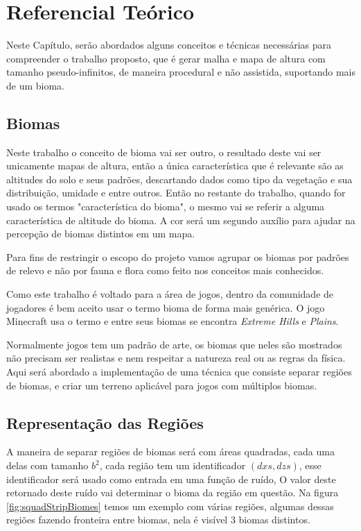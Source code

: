 \chapter{Referencial Teórico}
Neste Capítulo, serão abordados alguns conceitos e técnicas necessárias para
compreender o trabalho proposto, que é 
gerar malha e mapa de altura com tamanho pseudo-infinitos, de maneira procedural
e não assistida, suportando mais de um bioma.

\section{Biomas}
Neste trabalho o conceito de bioma vai ser outro, o resultado deste
vai ser unicamente mapas de altura, então a única característica que é relevante
são as altitudes do solo e seus padrões, descartando dados como tipo da
vegetação e sua distribuição, umidade e entre outros. Então no restante 
do trabalho, quando for usado os termos "característica do bioma", o mesmo vai
se referir a alguma característica de altitude do bioma. A cor será um segundo auxílio
para ajudar na percepção de biomas distintos em um mapa.

Para fins de restringir o escopo do projeto vamos agrupar os biomas por padrões
de relevo e não por fauna e flora como feito nos conceitos mais conhecidos.

Como este trabalho é voltado para a área de jogos, dentro da comunidade de jogadores
é bem aceito usar o termo bioma de forma mais genérica. O jogo Minecraft usa o
termo e entre seus biomas se encontra \textit{Extreme Hills} e \textit{Plains}.

Normalmente jogos tem um padrão de arte, os biomas que neles são mostrados não 
precisam ser realistas e nem respeitar a natureza real ou as regras da física. Aqui será 
abordado a implementação de uma técnica que consiste separar regiões de biomas, e criar
um terreno aplicável para jogos com múltiplos biomas.

\section{Representação das Regiões}
A maneira de separar regiões de biomas será com áreas quadradas, cada uma delas com
tamanho $b^{2}$, cada região tem um identificador $(dxs, dzs)$, esse identificador
será usado como entrada em uma função de ruído, O valor deste retornado deste ruído vai 
determinar o bioma da região em questão. Na figura \ref{fig:squadStripBiomes} temos
um exemplo com várias regiões, algumas dessas regiões fazendo fronteira entre biomas, 
nela é visível 3 biomas distintos.

